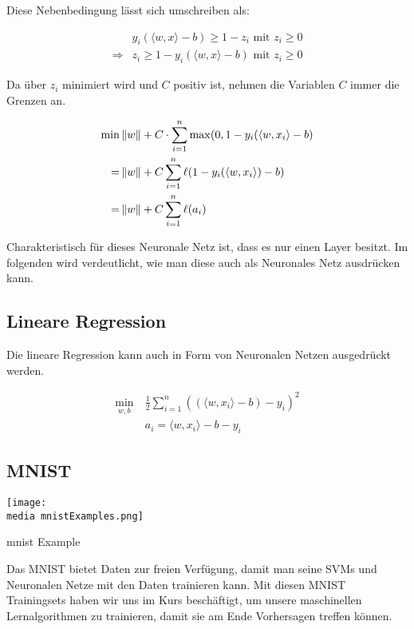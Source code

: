 Diese Nebenbedingung lässt sich umschreiben als:


\begin{align*}
&y_i (\langle w,x \rangle - b) \geq 1 - z_i \text { mit } z_i \geq 0 \\
\Rightarrow &z_i \geq 1- y_i (\langle w,x \rangle - b) \text{ mit } z_i \geq 0
\end{align*}

Da über $z_i$ minimiert wird und $C$ positiv ist, nehmen die Variablen $C$ immer die Grenzen an.

\begin{align*}
\min &\left\lVert w\right\rVert + C \cdot \sum_{i=1}^{n} \max (0, 1-y_i (\langle w,x_i\rangle-b) \\
 = &\left\lVert w\right\rVert + C \sum_{i=1}^{n} \ell ( 1-y_i (\langle w,x_i\rangle)-b) \\
=&\left\lVert w\right\rVert + C \sum_{i=1}^{n} \ell (a_i)
\end{align*}

Charakteristisch für dieses Neuronale Netz ist, dass es nur einen Layer besitzt. Im folgenden wird verdeutlicht, wie man diese auch als Neuronales Netz ausdrücken kann. 

\subsection{Lineare Regression}

Die lineare Regression kann auch in Form von Neuronalen Netzen ausgedrückt werden. 


\begin{align*}
\min\limits_{w,b} \ & \frac{1} {2} \sum_{i=1}^{n} ((\langle w,x_i\rangle- b) -y_i)^2 \\
&a_i = \langle w,x_i\rangle -b-y_i
\end{align*}

\subsection{MNIST}

\begin{dsafigure}
	\begin{center}
		\texttt{[image: \\media mnistExamples.png]}
		\caption{mnist Example }
		\label{FigConvNN}
	\end{center}
\end{dsafigure}

Das MNIST bietet Daten zur freien Verfügung, damit man seine SVMs und Neuronalen Netze mit den Daten trainieren kann. Mit diesen MNIST Trainingsets haben wir uns im Kurs beschäftigt, um unsere maschinellen Lernalgorithmen zu trainieren, damit sie am Ende Vorhersagen treffen können.



